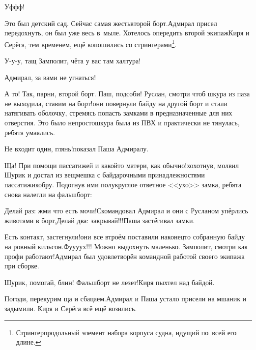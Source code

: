 \diagdash Уф\sdash ф\sdash ф!

\diagdash Это был детский сад. Сейчас самая жесть\mdash второй борт.\mdash Адмирал присел передохнуть, он был уже весь в~мыле. Хотелось опередить второй экипаж\mdash Киря и Серёга, тем временем, ещё копошились со стрингерами\footnote{Стрингер\mdash продольный элемент набора корпуса судна, идущий по~всей его длине\cite{МорскойСправочник}.}. 

\diagdash У-у-у, тащ Замполит, чёта у вас там халтура!

\diagdash Адмирал, за вами не угнаться!

\diagdash А то! Так, парни, второй борт. Паш, подсоби! Руслан, смотри чтоб шкура из паза не выходила, ставим на борт!\mdash они повернули байду на другой борт и стали натягивать оболочку, стремясь попасть замками в предназначенные для них отверстия. Это было непросто\mdash шкура была из ПВХ и практически не тянулась, ребята умаялись.

\diagdash Не входит один, глянь!\mdash показал Паша Адмиралу.

\diagdash Ща! При помощи пассатижей и какой\sdash то матери, как обычно!\mdash хохотнув, молвил Шурик и достал из вещмешка с байдарочными принадлежностями пассатижи\sdash кобру. Подогнув ими полукруглое ответное <<ухо>> замка, ребята снова налегли на фальшборт:

\diagdash Делай раз: жми что есть мочи!\mdash Скомандовал Адмирал и они с Русланом упёрлись животами в борт,\mdash Делай два: закрывай!!!\mdash Паша застёгивал замки.

\diagdash Есть контакт, застегнули!\mdash они все втроём поставили наконец\sdash то собранную байду на ровный кильсон.\mdash Фу\sdash у\sdash у\sdash ух!!! Можно выдохнуть маленько. Замполит, смотри как профи работают!\mdash Адмирал был удовлетворён командной работой своего экипажа при сборке.

\diagdash Шурик, помогай, блин! Фальшборт не лезет!\mdash Киря пыхтел над байдой.

\diagdash Погоди, перекурим ща и сбацаем.\mdash Адмирал и Паша устало присели на мшаник и задымили. Киря и Серёга всё ещё возились. 








\begin{center}
\end{center}
